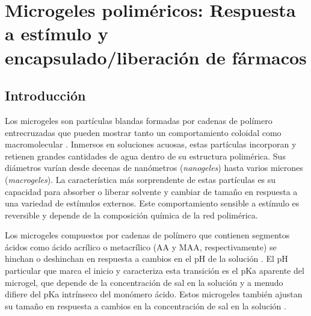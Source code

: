 
\chapter{Microgeles polim\'ericos: Respuesta a est\'imulo y encapsulado/liberaci\'on de f\'armacos} %

\label{Chapter-geles} %


\newcommand{\keyword}[1]{\textbf{#1}}
\newcommand{\tabhead}[1]{\textbf{#1}}
\newcommand{\code}[1]{\texttt{#1}}
\newcommand{\file}[1]{\texttt{\bfseries#1}}
\newcommand{\option}[1]{\texttt{\itshape#1}}





\section{Introducci\'on}


Los microgeles son part\'iculas blandas formadas por cadenas de pol\'imero entrecruzadas que pueden mostrar tanto un comportamiento coloidal como macromolecular \cite{plamper2017functional,lyon2012polymer}.
Inmersos en soluciones acuosas, estas part\'iculas incorporan y retienen grandes cantidades de agua dentro de su estructura polim\'erica.
Sus di\'ametros var\'ian desde decenas de nan\'ometros (\emph{nanogeles}) hasta varios micrones (\emph{macrogeles}).
La caracter\'istica m\'as sorprendente de estas part\'iculas es su capacidad para absorber o liberar solvente y cambiar de tama\~no en respuesta a una variedad de est\'imulos externos.
Este comportamiento sensible a est\'imulo es reversible y depende de la composici\'on qu\'imica de la red polim\'erica.

Los microgeles compuestos por cadenas de pol\'imero que contienen segmentos \'acidos como \'acido acr\'ilico o metacr\'ilico (AA y MAA, respectivamente) se hinchan o deshinchan  en respuesta a cambios en el pH de la soluci\'on \cite{snowden1996colloidal,Zhou1998}.
El pH particular que marca el inicio y caracteriza esta transici\'on es el pKa aparente del microgel, que depende de la concentraci\'on de sal en la soluci\'on y a menudo difiere del pKa intr\'inseco del mon\'omero \'acido.
Estos microgeles tambi\'en ajustan su tama\~no en respuesta a cambios en la concentraci\'on de sal en la soluci\'on \cite{snowden1996colloidal}.

